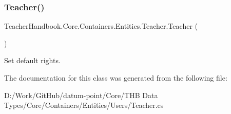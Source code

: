 \subsubsection{\texorpdfstring{Teacher()}{Teacher()}}
{\footnotesize\ttfamily Teacher\+Handbook.\+Core.\+Containers.\+Entities.\+Teacher.\+Teacher (\begin{DoxyParamCaption}{ }\end{DoxyParamCaption})}

Set default rights. 

The documentation for this class was generated from the following file\+:\begin{DoxyCompactItemize}
\item 
D\+:/\+Work/\+Git\+Hub/datum-\/point/\+Core/\+T\+H\+B Data Types/\+Core/\+Containers/\+Entities/\+Users/Teacher.\+cs\end{DoxyCompactItemize}
